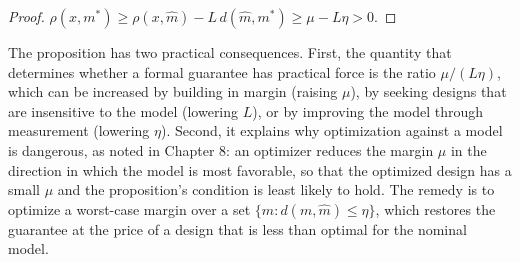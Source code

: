 \begin{proof}
$\rho(x,m^\ast)\ge\rho(x,\hat m)-L\,d(\hat m,m^\ast)\ge\mu-L\eta>0$.
\end{proof}

The proposition has two practical consequences. First, the quantity that determines whether a formal guarantee has practical force is the ratio $\mu/(L\eta)$, which can be increased by building in margin (raising $\mu$), by seeking designs that are insensitive to the model (lowering $L$), or by improving the model through measurement (lowering $\eta$). Second, it explains why optimization against a model is dangerous, as noted in Chapter 8: an optimizer reduces the margin $\mu$ in the direction in which the model is most favorable, so that the optimized design has a small $\mu$ and the proposition's condition is least likely to hold. The remedy is to optimize a worst-case margin over a set $\{m:d(m,\hat m)\le\eta\}$, which restores the guarantee at the price of a design that is less than optimal for the nominal model.
